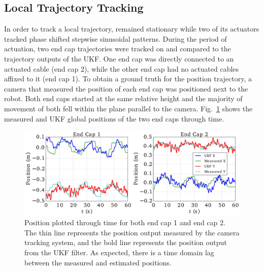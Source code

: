 {\subsection{Local Trajectory Tracking}
In order to track a local trajectory, \SB{} remained stationary while two of its actuators tracked phase shifted stepwise sinusoidal patterns.
During the period of actuation, two end cap trajectories were tracked on \SB{} and compared to the trajectory outputs of the UKF.
One end cap was directly connected to an actuated cable (end cap 2), while the other end cap had no actuated cables affixed to it (end cap 1).
To obtain a ground truth for the position trajectory, a camera that measured the position of each end cap was positioned next to the robot.
Both end caps started at the same relative height and the majority of movement of both fell within the plane parallel to the camera.
Fig.~\ref{fig:smalldisplacement} shows the measured and UKF global positions of the two end caps through time.

\begin{figure}[tpbh]
  \centering
  \includegraphics[width=1\linewidth]{tex/img/Node_tracking_1-11.pdf}
  \caption{Position plotted through time for both end cap 1 and end cap 2. The thin line represents the position output measured by the camera tracking system, and the bold line represents the position output from the UKF filter. As expected, there is a time domain lag between the measured and estimated positions.}
  \label{fig:smalldisplacement}
\end{figure}



}
